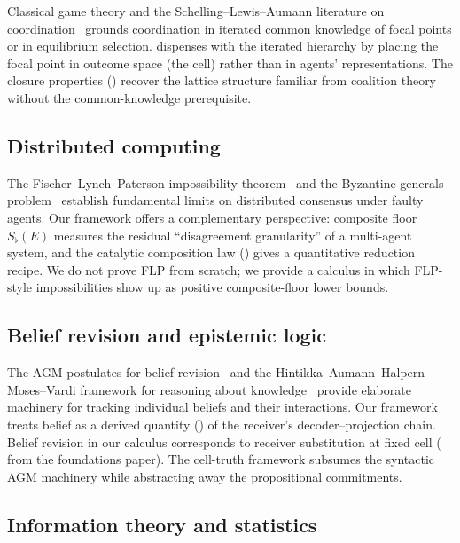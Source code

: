 \documentclass[11pt,twocolumn,a4paper]{article}
\newcommand{\Sfloor}{S_{\flat}}
\begin{document}
Classical game theory and the Schelling--Lewis--Aumann literature on
coordination~\cite{schelling1960,lewis1969,aumann1976,
nash1951,vonneumannmorgenstern1944,harsanyi1977} grounds coordination
in iterated common knowledge of focal points or in equilibrium
selection.  dispenses with the iterated
hierarchy by placing the focal point in outcome space (the cell)
rather than in agents' representations. The closure properties
() recover the lattice structure familiar from
coalition theory~\cite{harsanyi1977} without the common-knowledge
prerequisite.

\subsection{Distributed computing}

The Fischer--Lynch--Paterson impossibility theorem~\cite{fischer1985}
and the Byzantine generals problem~\cite{lamport1982} establish
fundamental limits on distributed consensus under faulty agents. Our
framework offers a complementary perspective: composite floor
$\Sfloor(E)$ measures the residual ``disagreement granularity'' of a
multi-agent system, and the catalytic composition law
() gives a quantitative reduction recipe. We do
not prove FLP from scratch; we provide a calculus in which FLP-style
impossibilities show up as positive composite-floor
lower bounds.

\subsection{Belief revision and epistemic logic}

The AGM postulates for belief revision~\cite{alchourron1985} and the
Hintikka--Aumann--Halpern--Moses--Vardi framework for reasoning about
knowledge~\cite{hintikka1962,aumann1999,fagin1995} provide elaborate
machinery for tracking individual beliefs and their interactions.
Our framework treats belief as a derived quantity ()
of the receiver's decoder--projection chain. Belief revision in our
calculus corresponds to receiver substitution at fixed cell
( from the foundations paper). The cell-truth
framework subsumes the syntactic AGM machinery while abstracting
away the propositional commitments.

\subsection{Information theory and statistics}
\end{document}
